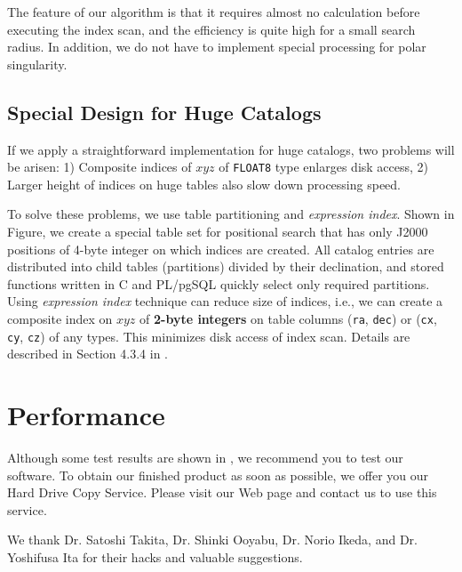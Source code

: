\documentclass[11pt,twoside]{article}
\begin{document}
The feature of our algorithm is that it requires almost no calculation
before executing the index scan, and the efficiency is quite high for a
small search radius.
In addition, we do not have to implement special processing for polar
singularity.

\subsection{Special Design for Huge Catalogs}

\begin{figure}[t]
\end{figure}

If we apply a straightforward implementation
for huge catalogs, two problems will be arisen: 
1) Composite indices of $x$$y$$z$
of {\tt FLOAT8} type enlarges disk access,
2) Larger height of indices on huge tables also slow down processing speed.

To solve these problems,
we use table partitioning and {\it expression index}.
Shown in Figure, 
we create a special table set for positional search
that has only J2000 positions of 4-byte integer on which indices are created.
All catalog entries are distributed into child tables (partitions)
divided by their declination, and
stored functions written in C and PL/pgSQL quickly select only required
partitions.
Using {\it expression index} technique can reduce size of indices, i.e.,
we can create a composite index on $x$$y$$z$ of
{\bf 2-byte integers} on table columns  
({\tt ra}, {\tt dec}) or ({\tt cx}, {\tt cy}, {\tt cz}) of any types.  
This minimizes disk access of index scan.
Details are described in Section 4.3.4 in \citet{yam_2011a}.


\section{Performance}

Although some test results are shown in \citet{yam_2011a},
we recommend you to test our software. 
To obtain our finished product as soon as possible,
we offer you our Hard Drive Copy Service. 
Please visit our Web page and contact us to use this service. 

\acknowledgements We thank 
Dr. Satoshi Takita, Dr. Shinki Ooyabu, Dr. Norio Ikeda, and Dr. Yoshifusa Ita
for their hacks and valuable suggestions.


\end{document}
